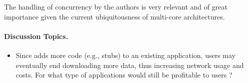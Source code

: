 The handling of concurrency by the authors is very relevant and
of great importance given the current ubiquitousness of
multi-core architectures.

\paragraph{Discussion Topics.}
\begin{itemize}
\item Since \dl{} adds more code (e.g., stubs) to an existing application, users
may eventually end downloading more data, thus increasing network usage and
costs. For what type of applications would \dl{} still be profitable to 
users ?

\end{itemize}
